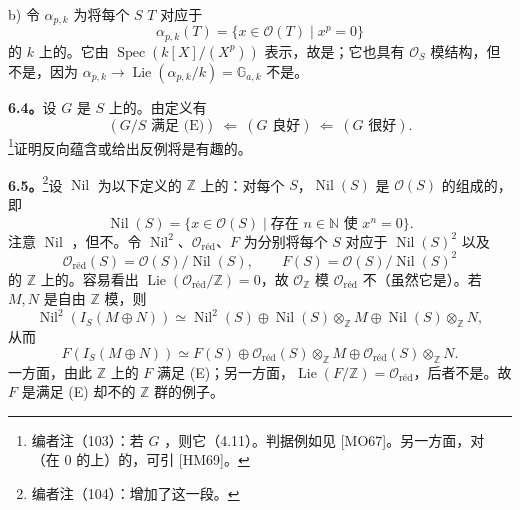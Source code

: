 b) 令 $\alpha_{p,k}$ 为将每个 $S$  $T$ 对应于
\[\alpha_{p,k}(T)=\{x\in\mathcal O(T)\mid x^p=0\}\]
的 $k$ 上的。它由 $\operatorname{Spec}(k[X]/(X^p))$ 表示，故是；它也具有 $\mathcal O_S$ 模结构，但不是，因为 $\alpha_{p,k}\to\operatorname{Lie}(\alpha_{p,k}/k)=\mathbb G_{a,k}$ 不是。

\textbf{6.4。}设 $G$ 是 $S$ 上的。由定义有
\[(G/S\text{ 满足 (E)})\ \Longleftarrow\ (G\text{ 良好})\ \Longleftarrow\ (G\text{ 很好}).\]
\footnote{编者注（103）：若 $G$ ，则它（4.11）。判据例如见 [MO67]。另一方面，对（在 $0$ 的上）的，可引 [HM69]。}证明反向蕴含或给出反例将是有趣的。

\textbf{6.5。}\footnote{编者注（104）：增加了这一段。}设 $\operatorname{Nil}$ 为以下定义的 $\mathbb Z$ 上的：对每个 $S$，$\operatorname{Nil}(S)$ 是 $\mathcal O(S)$ 的组成的，即
\[\operatorname{Nil}(S)=\{x\in\mathcal O(S)\mid\text{存在 }n\in\mathbb N\text{ 使 }x^n=0\}.\]
注意 $\operatorname{Nil}$ ，但不。令 $\operatorname{Nil}^2$、$\mathcal O_{\text{réd}}$、$F$ 为分别将每个 $S$ 对应于 $\operatorname{Nil}(S)^2$ 以及
\[\mathcal O_{\text{réd}}(S)=\mathcal O(S)/\operatorname{Nil}(S),\qquad F(S)=\mathcal O(S)/\operatorname{Nil}(S)^2\]
的 $\mathbb Z$ 上的。容易看出 $\operatorname{Lie}(\mathcal O_{\text{réd}}/\mathbb Z)=0$，故 $\mathcal O_{\mathbb Z}$ 模 $\mathcal O_{\text{réd}}$ 不（虽然它是）。若 $M,N$ 是自由 $\mathbb Z$ 模，则
\[\operatorname{Nil}^2(I_S(M\oplus N))\simeq\operatorname{Nil}^2(S)\oplus\operatorname{Nil}(S)\otimes_{\mathbb Z}M\oplus\operatorname{Nil}(S)\otimes_{\mathbb Z}N,\]
从而
\[F(I_S(M\oplus N))\simeq F(S)\oplus\mathcal O_{\text{réd}}(S)\otimes_{\mathbb Z}M\oplus\mathcal O_{\text{réd}}(S)\otimes_{\mathbb Z}N.\]
一方面，由此 $\mathbb Z$ 上的 $F$ 满足 (E)；另一方面，$\operatorname{Lie}(F/\mathbb Z)=\mathcal O_{\text{réd}}$，后者不是。故 $F$ 是满足 (E) 却不的 $\mathbb Z$ 群的例子。

